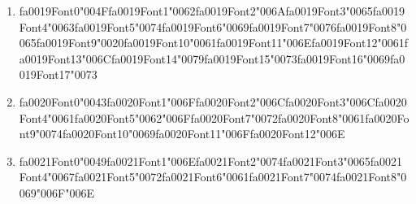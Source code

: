 \documentclass[12pt]{article}
\begin{document}
\begin{enumerate}[label=\arabic*.]
\begin{enumerate}[label=(\alph*)]
    \item {\csname fa0019Font0\endcsname\char"004F}{\csname fa0019Font1\endcsname\char"0062}{\csname fa0019Font2\endcsname\char"006A}{\csname fa0019Font3\endcsname\char"0065}{\csname fa0019Font4\endcsname\char"0063}{\csname fa0019Font5\endcsname\char"0074}{\csname fa0019Font6\endcsname\char"0069}{\csname fa0019Font7\endcsname\char"0076}{\csname fa0019Font8\endcsname\char"0065}{\csname fa0019Font9\endcsname\char"0020}{\csname fa0019Font10\endcsname\char"0061}{\csname fa0019Font11\endcsname\char"006E}{\csname fa0019Font12\endcsname\char"0061}{\csname fa0019Font13\endcsname\char"006C}{\csname fa0019Font14\endcsname\char"0079}{\csname fa0019Font15\endcsname\char"0073}{\csname fa0019Font16\endcsname\char"0069}{\csname fa0019Font17\endcsname\char"0073}
    \item {\csname fa0020Font0\endcsname\char"0043}{\csname fa0020Font1\endcsname\char"006F}{\csname fa0020Font2\endcsname\char"006C}{\csname fa0020Font3\endcsname\char"006C}{\csname fa0020Font4\endcsname\char"0061}{\csname fa0020Font5\endcsname\char"0062}{\char"006F}{\csname fa0020Font7\endcsname\char"0072}{\csname fa0020Font8\endcsname\char"0061}{\csname fa0020Font9\endcsname\char"0074}{\csname fa0020Font10\endcsname\char"0069}{\csname fa0020Font11\endcsname\char"006F}{\csname fa0020Font12\endcsname\char"006E}
    \item {\csname fa0021Font0\endcsname\char"0049}{\csname fa0021Font1\endcsname\char"006E}{\csname fa0021Font2\endcsname\char"0074}{\csname fa0021Font3\endcsname\char"0065}{\csname fa0021Font4\endcsname\char"0067}{\csname fa0021Font5\endcsname\char"0072}{\csname fa0021Font6\endcsname\char"0061}{\csname fa0021Font7\endcsname\char"0074}{\csname fa0021Font8\endcsname\char"0069}{\char"006F}{\char"006E}
\end{enumerate}
\end{enumerate}
\end{document}
